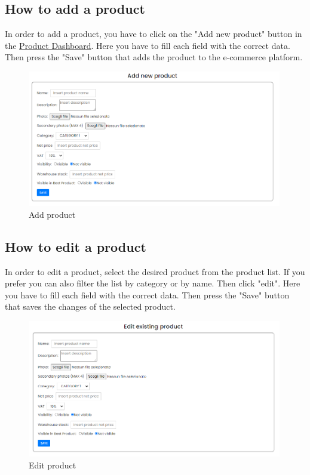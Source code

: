 \subsection{How to add a product}\label{_addProduct}
In order to add a product, you have to click on the "Add new product" button in the \hyperref[_productmanagement]{Product Dashboard}.
Here you have to fill each field with the correct data. Then press the "Save" button that adds the product to the e-commerce platform.
\begin{figure}[H]
    \centering
    \includegraphics[width=30em]{res/images/venditore/addproduct.png}
    \caption{Add product}
\end{figure}

\subsection{How to edit a product}
In order to edit a product, select the desired product from the product list. If you prefer you can also filter the list by category or by name. Then click "edit".
Here you have to fill each field with the correct data. Then press the "Save" button that saves the changes of the selected product.
\begin{figure}[H]
    \centering
    \includegraphics[width=30em]{res/images/venditore/editproduct.png}
    \caption{Edit product}
\end{figure}

